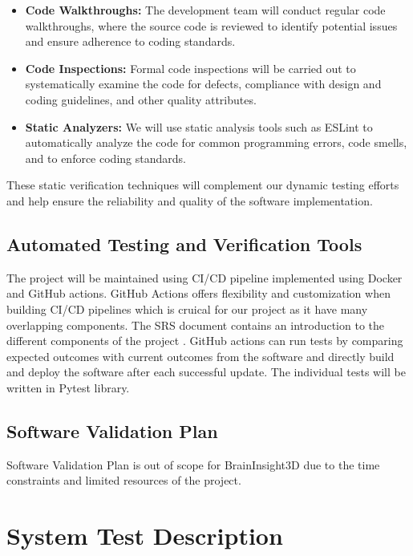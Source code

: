 \documentclass[12pt, titlepage]{article}
\begin{document}
\begin{itemize}
  \item \textbf{Code Walkthroughs:} The development team will conduct regular code walkthroughs, where the source code is reviewed to identify potential issues and ensure adherence to coding standards.

  \item \textbf{Code Inspections:} Formal code inspections will be carried out to systematically examine the code for defects, compliance with design and coding guidelines, and other quality attributes.

  \item \textbf{Static Analyzers:} We will use static analysis tools such as ESLint to automatically analyze the code for common programming errors, code smells, and to enforce coding standards.

\end{itemize}

These static verification techniques will complement our dynamic testing efforts and help ensure the reliability and quality of the software implementation.

\subsection{Automated Testing and Verification Tools} \label{section4.6}

The project will be maintained using CI/CD pipeline implemented using Docker and GitHub actions. GitHub Actions offers flexibility and customization when building CI/CD pipelines which is
cruical for our project as it have many overlapping components. The SRS document contains an introduction to the different components of the project \cite{BrainInsightSRS2024}. GitHub actions can
run tests by comparing expected outcomes with current outcomes from the software and directly build and deploy the software after each successful update. The individual tests will be written in Pytest library.
\subsection{Software Validation Plan} \label{section4.7}

Software Validation Plan is out of scope for BrainInsight3D due to the time constraints and limited resources of the project.

\section{System Test Description} \label{section5}
\end{document}
